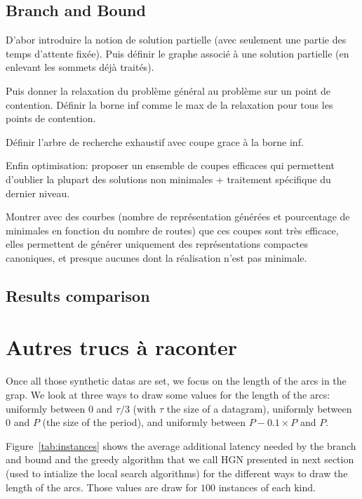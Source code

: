 \documentclass[english]{article}
\begin{document}
\subsection{Branch and Bound}

D'abor introduire la notion de solution partielle (avec seulement une partie des temps d'attente fixée).
Puis définir le graphe associé à une solution partielle (en enlevant les sommets déjà traités).

Puis donner la relaxation du problème général au problème sur un point de contention. 
Définir la borne inf comme le max de la relaxation pour tous les points de contention.

Définir l'arbre de recherche exhaustif avec coupe grace à la borne inf.

Enfin optimisation: proposer un ensemble de coupes efficaces qui permettent d'oublier la plupart des solutions 
non minimales + traitement spécifique du dernier niveau.

Montrer avec des courbes (nombre de représentation générées et pourcentage de minimales en fonction du nombre de routes) que ces coupes sont très efficace, elles permettent de générer uniquement des représentations compactes canoniques, et presque aucunes dont la réalisation n'est pas minimale.

\subsection{Results comparison}
\section{Autres trucs à raconter}
Once all those synthetic datas are set, we focus on the length of the arcs in the grap. We look at three ways to draw some values for the length of the arcs: uniformly between $0$ and $\tau/3$ (with $\tau$ the size of a datagram), uniformly between $0$ and $P$ (the size of the period), and uniformly between $P-0.1\times P$ and $P$.

Figure~\ref{tab:instances} shows the average additional latency needed by the branch and bound and the greedy algorithm that we call HGN presented in next section (used to intialize the local search algorithms) for the different ways to draw the length of the arcs. Those values are draw for $100$ instances of each kind.
\end{document}
